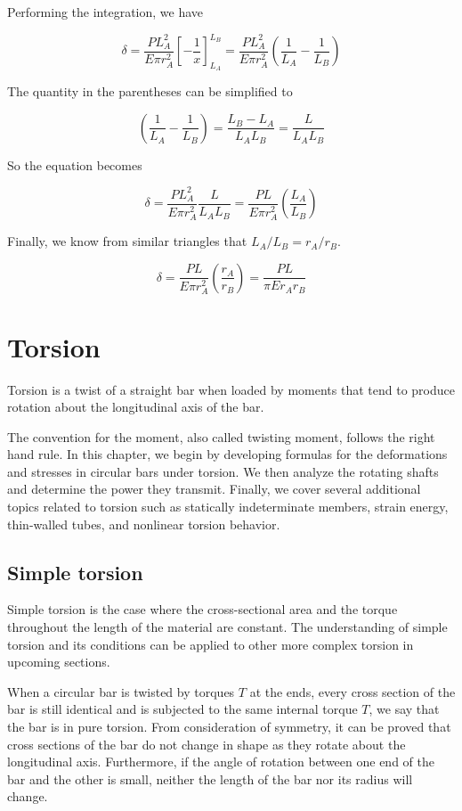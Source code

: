 \documentclass[
10pt,
a4paper,
openany,
svgnames,
]{book}
\begin{document}
\begin{solution}
Performing the integration, we have

\[\delta  = \frac{PL_A^2}{E\pi r_A^2}\left[ - \frac{1}{x} \right]_{L_A}^{L_B} = \frac{PL_A^2}{E\pi r_A^2}\left( \frac{1}{L_A} - \frac{1}{L_B} \right)\]	

The quantity in the parentheses can be simplified to

\[\left( \frac{1}{L_A} - \frac{1}{L_B} \right) = \frac{L_B - L_A}{L_AL_B} = \frac{L}{L_AL_B}\]	

So the equation becomes

\[\delta  = \frac{PL_A^2}{E\pi r_A^2}\frac{L}{L_AL_B} = \frac{PL}{E\pi r_A^2}\left( \frac{L_A}{L_B} \right)\]	

Finally, we know from similar triangles that $L_A/L_B = r_A/r_B$.

\[\delta  = \frac{PL}{E\pi r_A^2}\left( \frac{r_A}{r_B} \right) = \frac{PL}{\pi Er_Ar_B}\]

\end{solution}


\section{Torsion}

Torsion is a twist of a straight bar when loaded by moments that tend to produce rotation about the longitudinal axis of the bar.

The convention for the moment, also called twisting moment, follows the right hand rule. In this chapter, we begin by developing formulas for the deformations and stresses in circular bars under torsion. We then analyze the rotating shafts and determine the power they transmit. Finally, we cover several additional topics related to torsion such as statically indeterminate members, strain energy, thin-walled tubes, and nonlinear torsion behavior.

\subsection{Simple torsion}

Simple torsion is the case where the cross-sectional area and the torque throughout the length of the material are constant. The understanding of simple torsion and its conditions can be applied to other more complex torsion in upcoming sections.

When a circular bar is twisted by torques $T$ at the ends, every cross section of the bar is still identical and is subjected to the same internal torque $T$, we say that the bar is in pure torsion. From consideration of symmetry, it can be proved that cross sections of the bar do not change in shape as they rotate about the longitudinal axis. Furthermore, if the angle of rotation between one end of the bar and the other is small, neither the length of the bar nor its radius will change.
\end{document}
